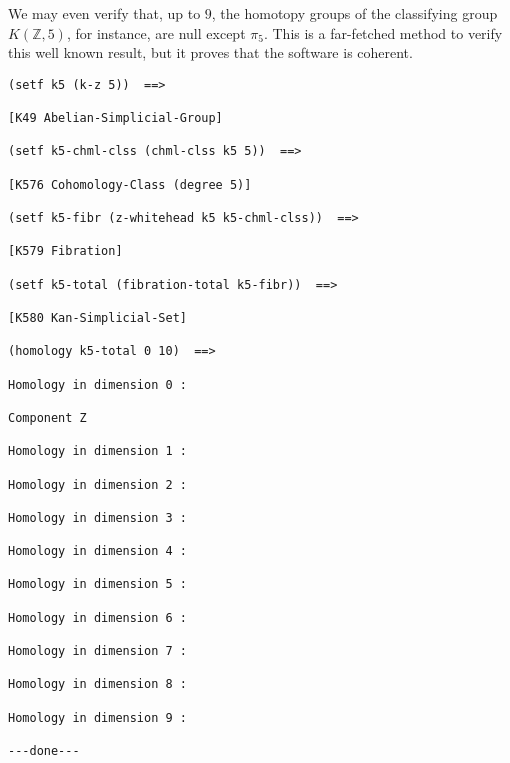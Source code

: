 We may even verify that, up to $9$, the homotopy groups of the classifying group $K(\mathbb{Z},5)$, for instance,
are null except $\pi_5$. This is a far-fetched method to verify this well known result, but
it proves that the software is coherent.
{\footnotesize\begin{verbatim}
(setf k5 (k-z 5))  ==>

[K49 Abelian-Simplicial-Group]

(setf k5-chml-clss (chml-clss k5 5))  ==>

[K576 Cohomology-Class (degree 5)]

(setf k5-fibr (z-whitehead k5 k5-chml-clss))  ==>

[K579 Fibration]

(setf k5-total (fibration-total k5-fibr))  ==>

[K580 Kan-Simplicial-Set]

(homology k5-total 0 10)  ==>

Homology in dimension 0 :

Component Z

Homology in dimension 1 :

Homology in dimension 2 :

Homology in dimension 3 :

Homology in dimension 4 :

Homology in dimension 5 :

Homology in dimension 6 :

Homology in dimension 7 :

Homology in dimension 8 :

Homology in dimension 9 :

---done---
\end{verbatim}}

